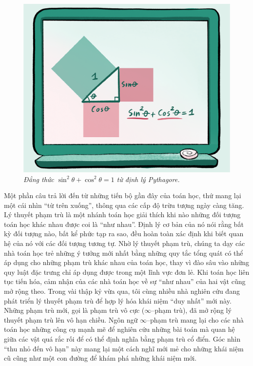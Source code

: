 \begin{multicols}{2}
\begin{figure}[H]
		\includegraphics[width=1\linewidth]{2}
		\caption{\small\textit{\color{duongvaotoanhoc}Đẳng thức $\sin^2\theta + \cos^2\theta = 1$ từ định lý Pythagore.}}
		\vspace*{-10pt}
	\end{figure}
	Một phần câu trả lời đến từ những tiến bộ gần đây của toán học, thứ mang lại một cái nhìn ``từ trên xuống'', thông qua các cấp độ trừu tượng ngày càng tăng. Lý thuyết phạm trù là một nhánh toán học giải thích khi nào những đối tượng toán học khác nhau được coi là ``như nhau''. Định lý cơ bản của nó nói rằng bất kỳ đối tượng nào, bất kể phức tạp ra sao, đều hoàn toàn xác định khi biết quan hệ của nó với các đối tượng tương tự. Nhờ lý thuyết phạm trù, chúng ta dạy các nhà toán học trẻ những ý tưởng mới nhất bằng những quy tắc tổng quát có thể áp dụng cho những phạm trù khác nhau của toán học, thay vì đào sâu vào những quy luật đặc trưng chỉ áp dụng được trong một lĩnh vực đơn lẻ.
	\vskip 0.1cm
	Khi toán học liên tục tiến hóa, cảm nhận của các nhà toán học về sự ``như nhau'' của hai vật cũng mở rộng theo. Trong vài thập kỷ vừa qua, tôi cùng nhiều nhà nghiên cứu đang phát triển lý thuyết phạm trù để hợp lý hóa khái niệm ``duy nhất'' mới này. Những phạm trù mới, gọi là phạm trù vô cực ($\infty$--phạm trù), đã mở rộng lý thuyết phạm trù lên vô hạn chiều. Ngôn ngữ $\infty$--phạm trù mang lại cho các nhà toán học những công cụ mạnh mẽ để nghiên cứu những bài toán mà quan hệ giữa các vật quá rắc rối để có thể định nghĩa bằng phạm trù cổ điển. Góc nhìn ``thu nhỏ đến vô hạn'' này mang lại một cách nghĩ mới mẻ cho những khái niệm cũ cũng như một con đường để khám phá những khái niệm mới.

\end{multicols}
